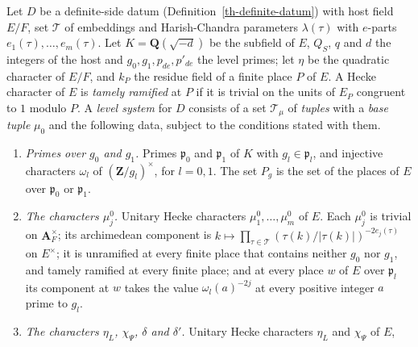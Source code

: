 \begin{definition}\label{th-grid}
Let $D$ be a definite-side datum (Definition~\ref{th-definite-datum}) with
host field $E/F$, set $\mathcal T$ of embeddings and Harish-Chandra parameters
$\lambda(\tau)$ with $e$-parts $e_1(\tau),\ldots,e_m(\tau)$. Let
$K=\mathbf Q(\sqrt{-d})$ be the subfield of $E$, $Q_S$, $q$ and $d$ the
integers of the host and $g_0,g_1,p_{de},p'_{de}$ the level primes; let $\eta$
be the quadratic character of $E/F$, and $k_P$ the residue field of a finite
place $P$ of $E$. A Hecke character of $E$ is \emph{tamely ramified} at $P$ if
it is trivial on the units of $E_P$ congruent to $1$ modulo $P$. A
\emph{level system} for $D$ consists of a set $\mathcal T_\mu$ of
\emph{tuples} with a \emph{base tuple} $\mu_0$ and the following data, subject
to the conditions stated with them.
\begin{enumerate}
\item[(L1)] \emph{Primes over $g_0$ and $g_1$.} Primes $\mathfrak p_0$ and
  $\mathfrak p_1$ of $K$ with $g_l\in\mathfrak p_l$, and injective characters
  $\omega_l$ of $(\mathbf Z/g_l)^\times$, for $l=0,1$. The set $P_g$ is the set
  of the places of $E$ over $\mathfrak p_0$ or $\mathfrak p_1$.
\item[(L2)] \emph{The characters $\mu^0_j$.} Unitary Hecke characters
  $\mu^0_1,\ldots,\mu^0_m$ of $E$. Each $\mu^0_j$ is trivial on
  $\mathbf A_F^\times$; its archimedean component is
  $k\mapsto\prod_{\tau\in\mathcal T}(\tau(k)/|\tau(k)|)^{-2e_j(\tau)}$ on
  $E^\times$; it is unramified at every finite place that contains neither
  $g_0$ nor $g_1$, and tamely ramified at every finite place; and at every
  place $w$ of $E$ over $\mathfrak p_l$ its component at $w$ takes the value
  $\omega_l(a)^{-2j}$ at every positive integer $a$ prime to $g_l$.
\item[(L3)] \emph{The characters $\eta_L$, $\chi_\Psi$, $\delta$ and
  $\delta'$.} Unitary Hecke characters $\eta_L$ and $\chi_\Psi$ of $E$,

\end{enumerate}
\end{definition}
